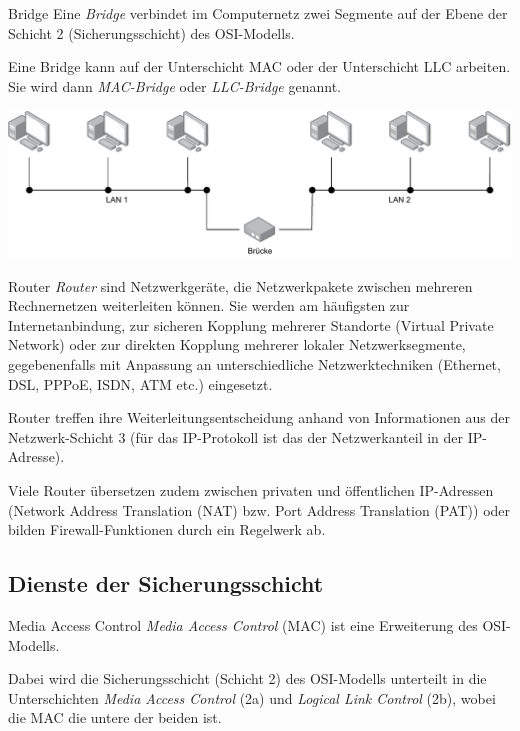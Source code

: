 \begin{defi}{Bridge}
    Eine \emph{Bridge} verbindet im Computernetz zwei Segmente auf der Ebene der Schicht 2 (Sicherungsschicht) des OSI-Modells.

    Eine Bridge kann auf der Unterschicht MAC oder der Unterschicht LLC arbeiten.
    Sie wird dann \emph{MAC-Bridge} oder \emph{LLC-Bridge} genannt.

    \centering
    \includegraphics[width=.7\textwidth]{includes/figures/defi_bruecke.pdf}
\end{defi}

\begin{defi}{Router}
    \emph{Router} sind Netzwerkgeräte, die Netzwerkpakete zwischen mehreren Rechnernetzen weiterleiten können.
    Sie werden am häufigsten zur Internetanbindung, zur sicheren Kopplung mehrerer Standorte (Virtual Private Network) oder zur direkten Kopplung mehrerer lokaler Netzwerksegmente, gegebenenfalls mit Anpassung an unterschiedliche Netzwerktechniken (Ethernet, DSL, PPPoE, ISDN, ATM etc.) eingesetzt.

    Router treffen ihre Weiterleitungsentscheidung anhand von Informationen aus der Netzwerk-Schicht 3 (für das IP-Protokoll ist das der Netzwerkanteil in der IP-Adresse).

    Viele Router übersetzen zudem zwischen privaten und öffentlichen IP-Adressen (Network Address Translation (NAT) bzw. Port Address Translation (PAT)) oder bilden Firewall-Funktionen durch ein Regelwerk ab.

\end{defi}

\subsection{Dienste der Sicherungsschicht}

\begin{defi}{Media Access Control}
    \emph{Media Access Control} (MAC) ist eine Erweiterung des OSI-Modells.

    Dabei wird die Sicherungsschicht (Schicht 2) des OSI-Modells unterteilt in die Unterschichten \emph{Media Access Control} (2a) und \emph{Logical Link Control} (2b), wobei die MAC die untere der beiden ist.
\end{defi}

